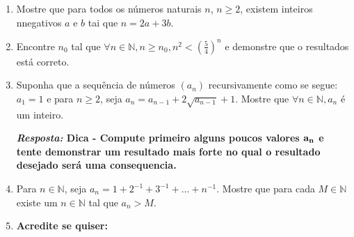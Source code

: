 \begin{enumerate}[{\bf 1.}]
\begin{enumerate}[a)]
{\bf{\it Resposta:} Quando ${\bf n=2}$ temos ${\bf 1-\frac{1}{2}=\frac{1}{2} }$, que claramente é verdade. Agora suponha que ${\bf k\in\mathbb{N}}$ e ${\bf (1-\frac{1}{2})(1-\frac{1}{3})...(1-\frac{1}{k})=\frac{1}{k}}$, então
\begin{eqnarray*}
{\bf \left(1-\frac{1}{2}\right)\left(1-\frac{1}{3}\right)...\left(1-\frac{1}{k}\right)\left(1-\frac{1}{k+1}\right)}&=&{\bf  \frac{1}{k}\left(1-\frac{1}{k+1}\right)}\\
                          &=&{\bf  \frac{1}{k}-\frac{1}{k(k+1)}}\\
                          &=&{\bf  \frac{(k+1)-1}{k(k+1)}}\\
                          &=&{\bf  \frac{k}{k(k+1)}}\\
                          &=&{\bf  \frac{1}{k+1}},
\end{eqnarray*}  
logo \'e verdade para ${\bf k+1}$, que completa o passo de indu\cao e assim a demonstra\cao por indu\caoi.}

\item $\forall n\in\mathbb{N}, (1-\frac{1}{2^2})(1-\frac{1}{3^2})...(1-\frac{1}{n^2})=\frac{1}{2}(1+\frac{1}{n})$.
\end{enumerate}

\item Mostre que para todos os n\'umeros naturais $n$, $n\geq 2$, existem inteiros n\ao negativos $a$ e $b$ tai que $n=2a+3b$.

\item Encontre $n_0$ tal que $\forall n\in\mathbb{N}, n\geq n_0, n^2<(\frac{5}{4})^n$ e demonstre que o resultados est\'a correto.

\item Suponha que a sequ\^encia de n\'umeros $(a_n)$ recursivamente como se segue: $a_1=1$ e para $n\geq 2$, seja $a_n=a_{n-1}+2\sqrt{a_{n-1}}+1$. Mostre que $\forall n\in\mathbb{N}, a_n$ \'e um inteiro.

{\bf{\it Resposta:} Dica - Compute primeiro alguns poucos valores ${\bf a_n}$ e tente demonstrar um resultado mais forte no qual o resultado desejado ser\'a uma consequencia.}

\item Para $n\in\mathbb{N}$, seja $a_n=1+2^{-1}+3^{-1}+...+n^{-1}$. Mostre que para cada $M\in\mathbb{N}$ existe um $n\in\mathbb{N}$ tal que $a_n>M$.

\item {\bf Acredite se quiser:}   


\end{enumerate}
